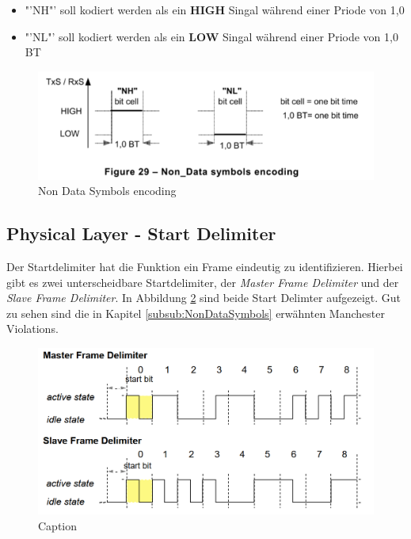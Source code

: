 \begin{itemize}
    \item "'NH"' soll kodiert werden als ein \textbf{HIGH} Singal während einer Priode von 1,0 
    \item "'NL"' soll kodiert werden als ein \textbf{LOW} Singal während einer Priode von 1,0 BT
\end{itemize}

\begin{figure}[h!]
    \centering
    \includegraphics[width = 0.7 \textwidth]{Figures/Chap2/Grundlagen/MVB_DOKU/Layer/Non_Data_Symbol.png}
    \caption{Non Data Symbols encoding}
    \label{fig:NonDataSymbolsEncoding}
\end{figure}

\subsection{Physical Layer - Start Delimiter}
Der Startdelimiter hat die Funktion ein Frame eindeutig zu identifizieren. Hierbei gibt es zwei unterscheidbare Startdelimiter, der \textit{Master Frame Delimiter} und der \textit{Slave Frame Delimiter}. In Abbildung \ref{fig:FrameDelimiterMasterSlave} sind beide Start Delimter aufgezeigt. Gut zu sehen sind die in Kapitel \ref{subsub:NonDataSymbols} erwähnten Manchester Violations. 

\begin{figure}[h!]
    \centering
    \includegraphics[width=0.8\linewidth]{Figures/Chap2/Grundlagen/MVB_DOKU/Layer/Frame_Delimiter.png}
    \caption{Caption}
    \label{fig:FrameDelimiterMasterSlave}
\end{figure}

